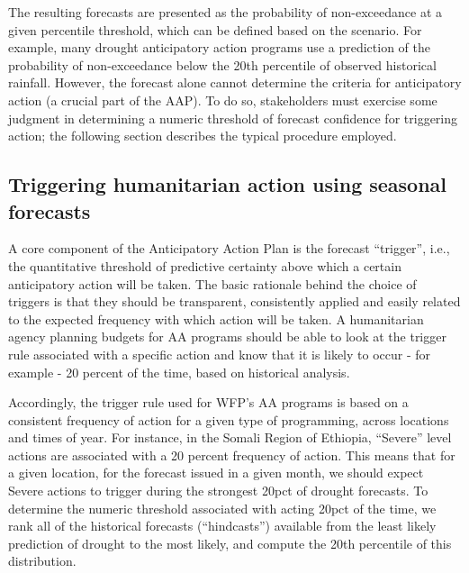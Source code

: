 \documentclass{ametsocV5}
\begin{document}
The resulting forecasts are presented as the probability of non-exceedance at a given percentile threshold, which can be defined based on the scenario. For example, many drought anticipatory action programs use a prediction of the probability of non-exceedance below the 20th percentile of observed historical rainfall. However, the forecast alone cannot determine the criteria for anticipatory action (a crucial part of the AAP). To do so, stakeholders must exercise some judgment in determining a numeric threshold of forecast confidence for triggering action; the following section describes the typical procedure employed.

\subsection{Triggering humanitarian action using seasonal forecasts}


A core component of the Anticipatory Action Plan is the forecast “trigger”, i.e., the quantitative threshold of predictive certainty above which a certain anticipatory action will be taken. The basic rationale behind the choice of triggers is that they should be transparent, consistently applied and easily related to the expected frequency with which action will be taken. A humanitarian agency planning budgets for AA programs should be able to look at the trigger rule associated with a specific action and know that it is likely to occur - for example - 20 percent  of the time, based on historical analysis. 

Accordingly, the trigger rule used for WFP's AA programs is based on a consistent frequency of action for a given type of programming, across locations and times of year. For instance, in the Somali Region of Ethiopia, “Severe” level actions are associated with a 20 percent frequency of action. This means that for a given location, for the forecast issued in a given month, we should expect Severe actions to trigger during the strongest 20pct of drought forecasts. To determine the numeric threshold associated with acting 20pct of the time, we rank all of the historical forecasts (“hindcasts”) available from the least likely prediction of drought to the most likely, and compute the 20th percentile of this distribution.
\end{document}
